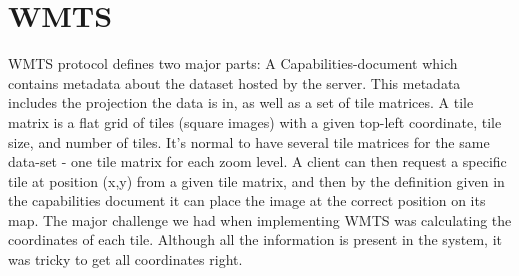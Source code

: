 \documentclass[11pt,a4paper,titlepage,oneside]{report}
\begin{document}
\section{WMTS}
\label{sec:WMTS}
\gls{WMTS} \gls{protocol} defines two major parts: A Capabilities-document which contains metadata about the dataset hosted by the server. This metadata includes the projection the data is in, as well as a set of tile matrices.  
A tile matrix is a flat grid of tiles (square images) with a given top-left coordinate, tile size, and number of tiles. It's normal to have several tile matrices for the same data-set - one tile matrix for each zoom level.  
A client can then request a specific tile at position (x,y) from a given tile matrix, and then by the definition given in the capabilities document it can place the image at the correct position on its map.  
The major challenge we had when implementing \gls{WMTS} was calculating the coordinates of each tile. Although all the information is present in the system, it was tricky to get all coordinates right. 
\end{document}
